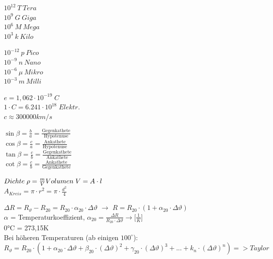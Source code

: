 \begin{minipage}{2.7cm}
	$10^{12} \: T \:Tera$ \\
	$10^9 \: G \: Giga$ \\
	$10^6 \: M \: Mega$ \\
	$10^3 \: k \: Kilo$ \\
\end{minipage}
\begin{minipage}{2.7cm}
	$10^{-12} \: p \:Pico$ \\
	$10^{-9} \: n \: Nano$ \\
	$10^{-6} \: \mu \: Mikro$ \\ 
	$10^{-3} \: m \: Milli$ \\
\end{minipage}
\begin{minipage}{4.5cm}
	$e = 1,062 \cdot 10^{-19} \; C$ \\
	$1\cdot C = 6.241\cdot 10^{18} \; Elektr.$ \\
	$c \approx 300000 km/s$ \\
\end{minipage}
\begin{minipage}{4cm}
	$\sin \beta = \frac ba =\frac{\text{Gegenkathete}}{\text{Hypotenuse}}$\\
	$\cos \beta = \frac ca =\frac{\text{Ankathete}}{\text{Hypotenuse}}$\\
	$\tan \beta = \frac cb =\frac{\text{Gegenkathete}}{\text{Ankathete}}$\\
	$\cot \beta = \frac cb =\frac{\text{Ankathete}}{\text{Gegenkathete}}$\\
\end{minipage}
\begin{minipage}{4cm}
	$Dichte \; \rho = \frac{m}{V} \\
	Volumen \; V = A \cdot l$ \\
	$A_{Kreis} = \pi \cdot r^2 = \pi \cdot \frac{d^2}{4}$ \\
\end{minipage}
$\Delta R = R_{\vartheta}-R_{20} = R_{20} \cdot \alpha_{20} \cdot \Delta \vartheta$ $\rightarrow$ $R = R_{20} \cdot (1 + \alpha_{20} \cdot \Delta \vartheta)$\\
$\alpha$ = Temperaturkoeffizient, $\alpha_{20}=\frac{\Delta R}{ R_{20} \cdot \Delta \vartheta} \rightarrow \lbrack \frac{1}{K} \rbrack$\\
0°C = 273,15K \\
Bei höheren Temperaturen (ab einigen $100^\circ$): \\
$R_{\vartheta} = R_{20} \cdot\left( 1 + \alpha_{20} \cdot \Delta \vartheta + \beta_{20} \cdot (\Delta \vartheta)^2 + \gamma_{20} \cdot (\Delta \vartheta)^3 + ... + k_{n} \cdot (\Delta \vartheta)^n \right) => Taylor  $

